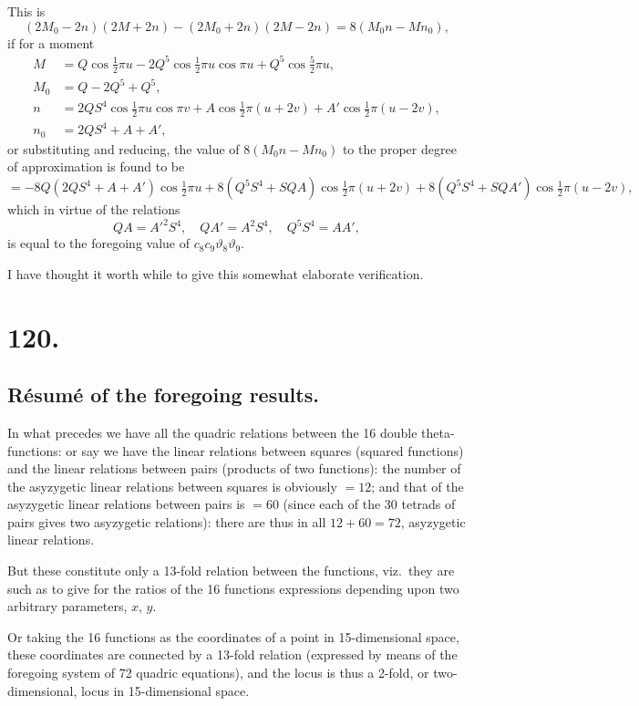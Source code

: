 \documentclass[11pt,a4paper]{article}
\newcommand{\uth}[1]{\vartheta_{#1}}
\begin{document}
This is
\[
(2M_0 - 2n)(2M + 2n) - (2M_0 + 2n)(2M - 2n) = 8(M_0n - Mn_0),
\]
if for a moment
\begin{align*}
M &= Q\cos\tfrac{1}{2}\pi u - 2Q^5\cos\tfrac{1}{2}\pi u\cos\pi u + Q^5\cos\tfrac{5}{2}\pi u, \\
M_0 &= Q - 2Q^5 + Q^5, \\
n &= 2QS^4\cos\tfrac{1}{2}\pi u\cos\pi v + A\cos\tfrac{1}{2}\pi(u+2v) + A'\cos\tfrac{1}{2}\pi(u-2v), \\
n_0 &= 2QS^4 + A + A',
\end{align*}
or substituting and reducing, the value of $8(M_0n - Mn_0)$ to the proper degree of approximation is found to be
\[
= -8Q(2QS^4 + A + A')\cos\tfrac{1}{2}\pi u + 8(Q^5S^4 + SQA)\cos\tfrac{1}{2}\pi(u+2v) + 8(Q^5S^4 + SQA')\cos\tfrac{1}{2}\pi(u-2v),
\]
which in virtue of the relations
\[
QA = A'^2S^4, \quad QA' = A^2S^4, \quad Q^5S^4 = AA',
\]
is equal to the foregoing value of $c_8c_9\uth{8}\uth{9}$.

I have thought it worth while to give this somewhat elaborate verification.

\newpage
\section*{120.}
\label{sec:120}

\subsection*{R\'{e}sum\'{e} of the foregoing results.}

In what precedes we have all the quadric relations between the 16 double theta-functions: or say we have the linear relations between squares (squared functions) and the linear relations between pairs (products of two functions): the number of the asyzygetic linear relations between squares is obviously $= 12$; and that of the asyzygetic linear relations between pairs is $= 60$ (since each of the 30 tetrads of pairs gives two asyzygetic relations): there are thus in all $12 + 60 = 72$, asyzygetic linear relations.

But these constitute only a 13-fold relation between the functions, viz.\ they are such as to give for the ratios of the 16 functions expressions depending upon two arbitrary parameters, $x$, $y$.

Or taking the 16 functions as the coordinates of a point in 15-dimensional space, these coordinates are connected by a 13-fold relation (expressed by means of the foregoing system of 72 quadric equations), and the locus is thus a 2-fold, or two-dimensional, locus in 15-dimensional space.
\end{document}
